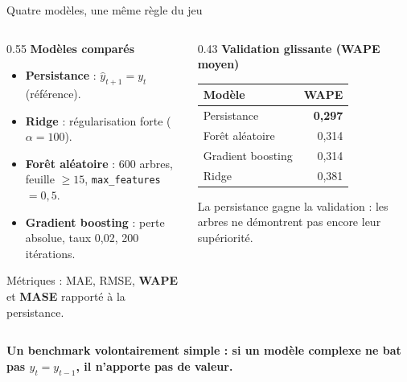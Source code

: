 \documentclass[aspectratio=169,10pt]{beamer}
\begin{document}
\begin{frame}{Quatre modèles, une même règle du jeu}
  \begin{columns}[T,onlytextwidth]
    \begin{column}{0.55\textwidth}
      \textbf{Modèles comparés}
      \begin{itemize}
        \item \textbf{Persistance} : $\hat y_{t+1} = y_t$ (référence).
        \item \textbf{Ridge} : régularisation forte ($\alpha = 100$).
        \item \textbf{Forêt aléatoire} : 600 arbres, feuille $\geq 15$,
              \texttt{max\_features} $= 0{,}5$.
        \item \textbf{Gradient boosting} : perte absolue, taux 0,02,
              200 itérations.
      \end{itemize}
      \vspace{0.3em}
      \small Métriques : MAE, RMSE, \textbf{WAPE} et \textbf{MASE} rapporté
      à la persistance.
    \end{column}
    \begin{column}{0.43\textwidth}
      \textbf{Validation glissante (WAPE moyen)}
      \begin{tabular}{lr}
        \toprule
        Modèle & WAPE \\
        \midrule
        Persistance & \textbf{0,297} \\
        Forêt aléatoire & 0,314 \\
        Gradient boosting & 0,314 \\
        Ridge & 0,381 \\
        \bottomrule
      \end{tabular}
      \vspace{0.5em}

      \small La persistance gagne la validation : les arbres ne démontrent
      pas encore leur supériorité.
    \end{column}
  \end{columns}

  \vfill
  \begin{center}
    \parbox{0.78\textwidth}{\centering\small\color{vertfonce}\textbf{Un
    benchmark volontairement simple : si un modèle complexe ne bat pas
    $y_t = y_{t-1}$, il n'apporte pas de valeur.}}
  \end{center}
\end{frame}
\end{document}
